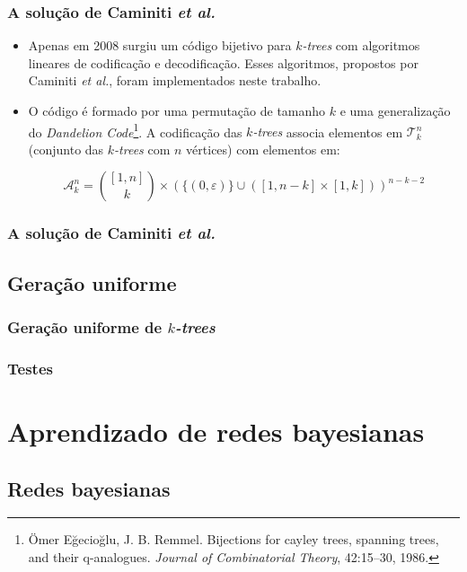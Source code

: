 \documentclass{beamer}
\begin{document}
  \begin{frame}
    \frametitle{A solução de Caminiti \emph{et al.}}

    \begin{itemize}
      \item Apenas em 2008 surgiu um código bijetivo para \emph{$k$-trees} com algoritmos lineares de codificação e decodificação. Esses algoritmos, propostos por Caminiti \emph{et al.}, foram implementados neste trabalho.
      \item O código é formado por uma permutação de tamanho $k$ e uma generalização do \emph{Dandelion Code}\footnote{\scriptsize Ömer Eğecioğlu, J. B. Remmel. Bijections for cayley trees, spanning trees, and their q-analogues. \emph{Journal of Combinatorial Theory}, 42:15--30, 1986.}. A codificação das \emph{$k$-trees} associa elementos em $\mathcal{T}^n_k$ (conjunto das \emph{$k$-trees} com $n$ vértices) com elementos em:

        $$
        \mathcal{A}^n_k = { [1,n] \choose k } \times (\{ ( 0, \varepsilon ) \} \cup ([1,n-k] \times [1,k]))^{n-k-2}
        $$
    \end{itemize}
  \end{frame}

  \begin{frame}
    \frametitle{A solução de Caminiti \emph{et al.}}

  \end{frame}

  \subsection{Geração uniforme}

  \begin{frame}
    \frametitle{Geração uniforme de \emph{$k$-trees}}

  \end{frame}

  \begin{frame}
    \frametitle{Testes}

  \end{frame}

  \section{Aprendizado de redes bayesianas}

  \subsection{Redes bayesianas}
\end{document}
